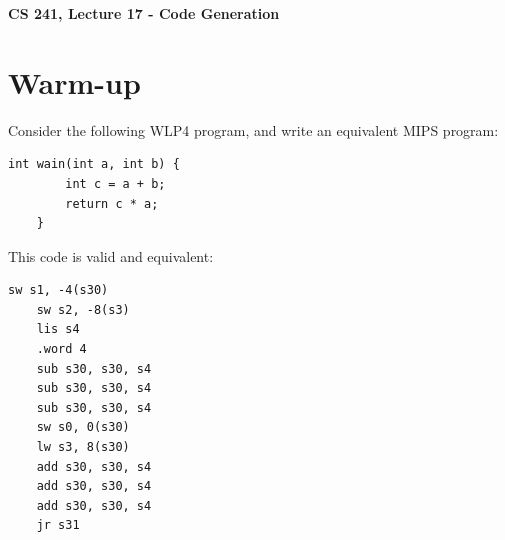 \documentclass[12pt]{article}
\author{Clement Tsang}
\begin{document}
\begin{center}
\Large\textbf{CS 241, Lecture 17 - Code Generation}
\end{center}

\section{Warm-up}
Consider the following WLP4 program, and write an equivalent MIPS program:
\begin{lstlisting}[mathescape, numbers=none, breaklines=true]
    int wain(int a, int b) {
        int c = a + b;
        return c * a;
    }
\end{lstlisting}
This code is valid and equivalent:   
\begin{lstlisting}[mathescape, numbers=none, breaklines=true]
    sw s1, -4(s30)
    sw s2, -8(s3)
    lis s4
    .word 4
    sub s30, s30, s4
    sub s30, s30, s4
    sub s30, s30, s4
    sw s0, 0(s30)
    lw s3, 8(s30)
    add s30, s30, s4
    add s30, s30, s4
    add s30, s30, s4
    jr s31
\end{lstlisting}
\end{document}
